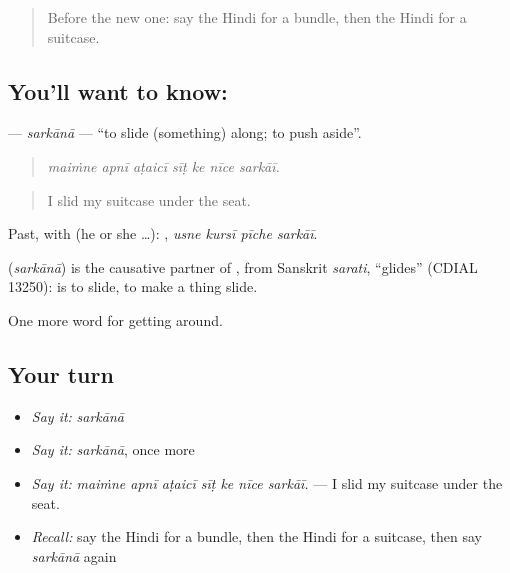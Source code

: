 \begin{quote}
Before the new one: say the Hindi for a bundle, then the Hindi for a suitcase.
\end{quote}

\subsection*{You'll want to know: }
\textbf{} — \emph{sarkānā} — \textquotedblleft{}to slide (something) along; to push aside\textquotedblright{}.

\begin{quote}
      
\end{quote}

\begin{quote}
\emph{maiṁne apnī aṭaicī sīṭ ke nīce sarkāī.}
\end{quote}

\begin{quote}
I slid my suitcase under the seat.
\end{quote}

Past, with  (he or she …):    , \emph{usne kursī pīche sarkāī}.

\begin{cousinweb}
\textbf{} (\emph{sarkānā}) is the causative partner of , from Sanskrit \emph{sarati}, \textquotedblleft{}glides\textquotedblright{} (CDIAL 13250):  is to slide,  to make a thing slide.
\end{cousinweb}

\begin{grammarlens}[title={What you've built}]
One more word for getting around.
\end{grammarlens}

\subsection*{Your turn}
\begin{itemize}
\raggedright
  \item \emph{Say it:} \emph{sarkānā}
  \item \emph{Say it:} \emph{sarkānā}, once more
  \item \emph{Say it:} \emph{maiṁne apnī aṭaicī sīṭ ke nīce sarkāī.} — I slid my suitcase under the seat.
  \item \emph{Recall:} say the Hindi for a bundle, then the Hindi for a suitcase, then say \emph{sarkānā} again
\end{itemize}

